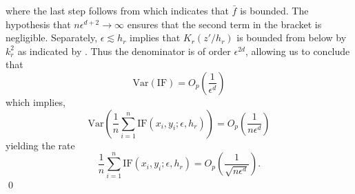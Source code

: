 \documentclass[11pt]{article}
\begin{document}
where the last step follows from  which indicates that $\bar{f}$ is bounded. The hypothesis that $n\epsilon^{d+2} \rightarrow \infty$ ensures that the second term in the bracket is negligible. Separately, $\epsilon \lesssim h_r$ implies that $K_r(z'/h_r)$ is bounded from below by $k_r^2$ as indicated by .  Thus the denominator is of order $\epsilon^{2d}$, allowing us to conclude that
\begin{equation}
    \text{Var}(\text{IF}) = O_p\left(\frac{1}{\epsilon^{d}}\right)
\end{equation}
which implies,
\begin{equation}
    \text{Var}\left(\frac{1}{n}\sum_{i = 1}^n\text{IF}(x_i,y_i;\epsilon, h_r)\right) = O_p\left(\frac{1}{n\epsilon^{d}}\right)
\end{equation}
yielding the rate
\begin{equation}
    \frac{1}{n}\sum_{i = 1}^n\text{IF}(x_i,y_i;\epsilon, h_r) = O_p\left(\frac{1}{\sqrt{n\epsilon^{d}}}\right).
\end{equation}
\qed{}
\end{document}
